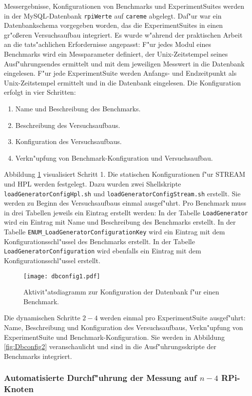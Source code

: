 Messergebnisse, Konfigurationen von Benchmarks und ExperimentSuites werden in der My\-SQL-Datenbank \texttt{rpiWerte} auf \texttt{careme} abgelegt. Daf"ur war ein Datenbankschema vorgegeben worden, das die ExperimentSuites in einen gr"o\ss eren Versuchsaufbau integriert. Es wurde w"ahrend der praktischen Arbeit an die tats"achlichen Erfordernisse angepasst: F"ur jedes Modul eines Benchmarks wird ein Messparameter definiert, der Unix-Zeitstempel seines Ausf"uhrungsendes ermittelt und mit dem jeweiligen Messwert in die Datenbank eingelesen. F"ur jede ExperimentSuite werden Anfangs- und Endzeitpunkt als Unix-Zeitstempel ermittelt und in die Datenbank eingelesen. Die Konfiguration erfolgt in vier Schritten:  
\begin{enumerate}%
	\item Name und Beschreibung des Benchmarks. 
	\item Beschreibung des Versuchsaufbaus. 
	\item Konfiguration des Versuchsaufbaus. 
	\item Verkn"upfung von Benchmark-Konfiguration und Versuchsaufbau.
\end{enumerate} 
Abbildung \ref{fig:Dbconfig1} visualisiert Schritt 1. Die statischen Konfigurationen f"ur STREAM und HPL werden festgelegt. Dazu wurden zwei Shellskripte \texttt{loadGeneratorCon\-figHpl.sh} und \texttt{loadGe\-nerator\-ConfigStream.sh} erstellt. Sie werden zu Beginn des Versuchsaufbaus einmal ausgef"uhrt. Pro Benchmark muss in drei Tabellen jeweils ein Eintrag erstellt werden: In der Tabelle \texttt{LoadGenerator} wird ein Eintrag mit Name und Beschreibung des Benchmarks erstellt. In der Tabelle \texttt{ENUM\_LoadGeneratorConfigura\-tionKey} wird ein Eintrag mit dem Konfigurationsschl"ussel des Benchmarks erstellt. In der Tabelle \texttt{LoadGeneratorConfiguration} wird ebenfalls ein Eintrag mit dem Konfigurationsschl"ussel erstellt.
\begin{figure}[htb]
\centering
\texttt{[image: dbconfig1.pdf]}
\caption{Aktivit"atsdiagramm zur Konfiguration der Datenbank f"ur einen Benchmark.}
\label{fig:Dbconfig1}
\end{figure}
Die dynamischen Schritte $2-4$ werden einmal pro ExperimentSuite ausgef"uhrt: Name, Beschreibung und Konfiguration des Versuchsaufbaus, Verkn"upfung von ExperimentSuite und Benchmark-Konfiguration. Sie werden in Abbildung \ref{fig:Dbconfig2} veranschaulicht und sind in die Ausf"uhrungsskripte der Benchmarks integriert. 

\subsubsection{Automatisierte Durchf"uhrung der Messung auf $n-4$ RPi-Knoten} 

